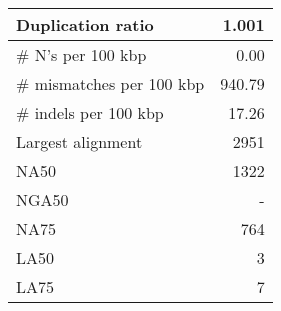 \documentclass[12pt,a4paper]{article}
\begin{document}
\begin{table}[ht]
\begin{center}
\begin{tabular}{|l*{1}{|r}|}
Duplication ratio & 1.001 \\ \hline
\# N's per 100 kbp & 0.00 \\ \hline
\# mismatches per 100 kbp & 940.79 \\ \hline
\# indels per 100 kbp & 17.26 \\ \hline
Largest alignment & 2951 \\ \hline
NA50 & 1322 \\ \hline
NGA50 & - \\ \hline
NA75 & 764 \\ \hline
LA50 & 3 \\ \hline
LA75 & 7 \\ \hline
\end{tabular}
\end{center}
\end{table}
\end{document}
